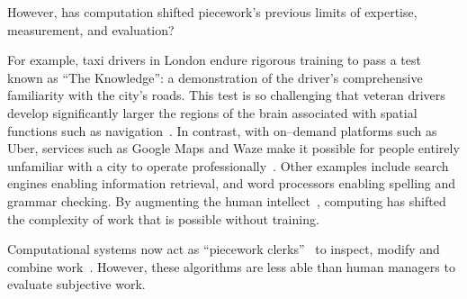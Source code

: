 \documentclass[trackingWork]{subfiles}
\begin{document}
However, has computation shifted piecework's previous limits of expertise, measurement, and evaluation?


For example, taxi drivers in London endure rigorous training to pass a test known as ``The Knowledge'': a demonstration of the driver's comprehensive familiarity with the city's roads.
This test is so challenging that veteran drivers develop significantly larger
the regions of the brain associated with spatial functions such as navigation~\cite{Maguire11042000,Maguire2894,Skok:1999:KML:299513.299625,skok2000managing,Woollett1407,woollett2011acquiring}.
In contrast, with on--demand platforms such as Uber, services such as Google Maps and Waze make it possible for
people entirely unfamiliar with a city
to operate professionally~\cite{silva2013traffic,hind2014outsmarting}.
Other examples include search engines enabling information retrieval, and
word processors enabling spelling and grammar checking.
By augmenting the human intellect~\cite{engelbart2001augmenting},
computing has shifted the complexity of work that is possible without training.

Computational systems now %
act as ``piecework clerks''~\cite{10.2307/23702539} to inspect, modify and combine work~\cite{turkopticon,takingAHITMcInnis}.
However, these algorithms are less able than human managers to evaluate subjective work.
\end{document}
